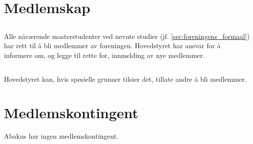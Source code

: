 \section{Medlemskap}

\subsection{}
Alle nåværende masterstudenter ved nevnte studier (jf. \ref{sec:foreningens_formaal})  har rett til å bli medlemmer av foreningen. 
Hovedstyret har ansvar for å informere om, og legge til rette for, innmelding av nye medlemmer.

\subsection{}
Hovedstyret kan, hvis spesielle grunner tilsier det, tillate andre å bli medlemmer. 

\section{Medlemskontingent}
Abakus har ingen medlemskontingent.
